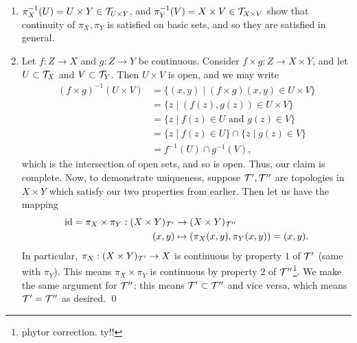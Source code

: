 \begin{enumerate}
    \item $\pi_X^{-1}(U) = U \times Y \in \mathcal T_{U \times Y}$, and $\pi_Y^{-1}(V) = X \times V \in \mathcal T_{X \times V}$ show that continuity of $\pi_X, \pi_Y$ is satisfied on basic sets, and so they are satisfied in general.
    \item Let $f : Z \to X$ and $g : Z \to Y$ be continuous. Consider $f \times g : Z \to X \times Y$, and let $U \subset \mathcal T_X$ and $V \subset \mathcal T_Y$. Then $U \times V$ is open, and we may write
    \begin{align*}
        (f \times g)^{-1}(U \times V) &= \{(x, y) \mid (f \times g)(x, y) \in U \times V\} \\
        &= \{z \mid (f(z), g(z)) \in U \times V\} \\
        &= \{z \mid f(z) \in U \text{ and } g(z) \in V\} \\
        &= \{z \mid f(z) \in U\} \cap \{z \mid g(z) \in V\} \\
        &= f^{-1}(U) \cap g^{-1}(V),
    \end{align*}
    which is the intersection of open sets, and so is open. Thus, our claim is complete. Now, to demonstrate uniqueness, suppose $\mathcal T', \mathcal T''$ are topologies in $X \times Y$ which satisfy our two properties from earlier. Then let us have the mapping
    \begin{align*}
        \mathrm{id} = \pi_X \times \pi_Y : (X \times Y)_{\mathcal T'} &\to (X \times Y)_{\mathcal T''} \\
        (x, y) &\mapsto (\pi_X(x, y), \pi_Y(x, y)) = (x, y).
    \end{align*}
    In particular, $\pi_X : (X \times Y)_{\mathcal T'} \to X$ is continuous by property $1$ of $\mathcal T'$ (same with $\pi_Y$). This means $\pi_X \times \pi_Y$ is continuous by property $2$ of $\mathcal T''$\footnote{phytor correction. ty!!}. We make the same argument for $\mathcal T''$; this means $\mathcal T' \subset \mathcal T''$ and vice versa, which means $\mathcal T' = \mathcal T''$ as desired. \qed
\end{enumerate}